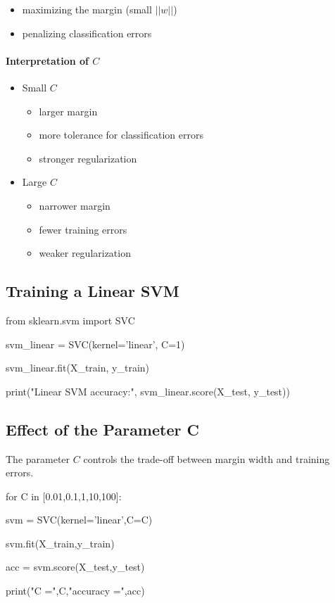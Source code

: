 \documentclass[12pt]{article}
\begin{document}
\begin{itemize}
\item maximizing the margin (small $||w||$)
\item penalizing classification errors
\end{itemize}

\paragraph{Interpretation of $C$}

\begin{itemize}
\item Small $C$  
      \begin{itemize}
      \item larger margin
      \item more tolerance for classification errors
      \item stronger regularization
      \end{itemize}

\item Large $C$  
      \begin{itemize}
      \item narrower margin
      \item fewer training errors
      \item weaker regularization
      \end{itemize}
\end{itemize}

\subsection*{Training a Linear SVM}

\begin{py-box}
from sklearn.svm import SVC

svm_linear = SVC(kernel='linear', C=1)

svm_linear.fit(X_train, y_train)

print("Linear SVM accuracy:",
      svm_linear.score(X_test, y_test))
\end{py-box}


\subsection{Effect of the Parameter C}

The parameter $C$ controls the trade-off between margin width and training errors.

\begin{py-box}
for C in [0.01,0.1,1,10,100]:

    svm = SVC(kernel='linear',C=C)

    svm.fit(X_train,y_train)

    acc = svm.score(X_test,y_test)

    print("C =",C,"accuracy =",acc)
\end{py-box}
\end{document}
